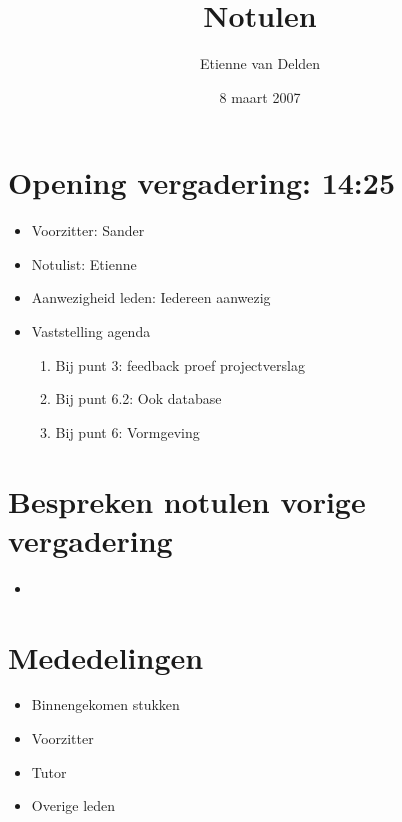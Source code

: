 \documentclass[]{article}
\begin{document}
\title{Notulen}
\author{ Etienne van Delden\\ }

\date{8 maart 2007}

\maketitle


\section{Opening vergadering: 14:25}
  \begin{itemize}
      \item Voorzitter: Sander
      \item Notulist: Etienne
      \item Aanwezigheid leden: Iedereen aanwezig
      \item Vaststelling agenda
		\begin{enumerate}
			\item Bij punt 3: feedback proef projectverslag
			\item Bij punt 6.2: Ook database
			\item Bij punt 6: Vormgeving 
		\end{enumerate}
  \end{itemize}

\section{Bespreken notulen vorige vergadering}
	\begin{itemize}
		\item 
	\end{itemize}


\section{Mededelingen}
    \begin{itemize}
    \item Binnengekomen stukken
    \item Voorzitter
    \item Tutor
    \item Overige leden
    \end{itemize}
\end{document}
